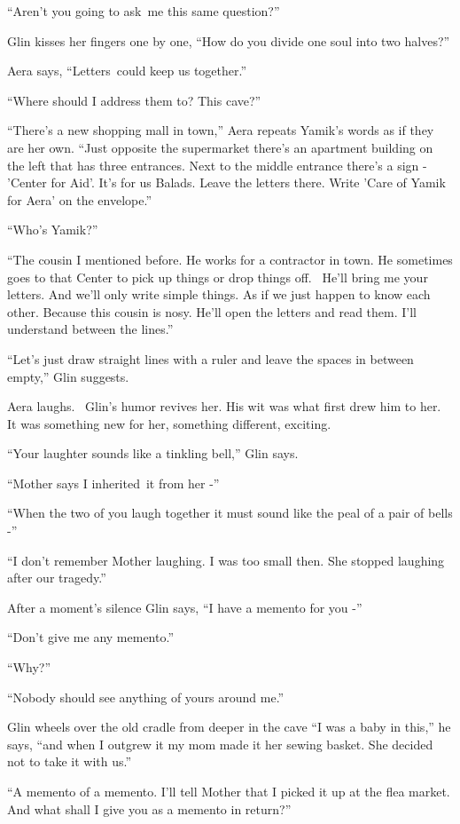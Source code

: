 \documentclass[twoside,11pt]{book}
\begin{document}
``Aren't you going to ask~me this same question?'' 

Glin kisses her fingers one by one, ``How do you divide one soul into two halves?''

Aera says, ``Letters~could keep us together.'' 

``Where should I address them to? This cave?'' 

``There's a new shopping mall in town,'' Aera repeats Yamik's words as if they are her own.
``Just opposite the supermarket there's an apartment building on the left that has three entrances. Next
to the middle entrance there's a sign - 'Center for Aid'. It's for us Balads. Leave the letters there. Write 'Care of
Yamik for Aera' on the envelope.'' 

``Who's Yamik?'' 

``The cousin I mentioned before. He works for a contractor in town. He sometimes goes to that Center to
pick up things or drop things off.~ He'll bring me your letters. And we'll only write simple things. As if we just
happen to know each other. Because this cousin is nosy. He'll open the letters and read them. I'll understand between
the lines.''

``Let's just draw straight lines with a ruler and leave the spaces in between empty,'' Glin
suggests. 

Aera laughs. ~Glin's humor revives her. His wit was what first drew him to her. It was something new for her, something
different, exciting.

``Your laughter sounds like a tinkling bell,'' Glin says.

``Mother says I inherited\ it from her -'' 

``When the two of you laugh together it must sound like the peal of a pair of bells -'' 

``I don't remember Mother laughing. I was too small then. She stopped laughing after our
tragedy.''

After a moment's silence Glin says, ``I have a memento for you -'' 

``Don't give me any memento.'' 

``Why?'' 

``Nobody should see anything of yours around me.'' 

Glin wheels over the old cradle from deeper in the cave ``I was a baby in this,'' he says,
``and when I outgrew it my mom made it her sewing basket. She decided not to take it with
us.'' 

``A memento of a memento. I'll tell Mother that I picked it up at the flea market. And what shall I give
you as a memento in return?''
\end{document}
